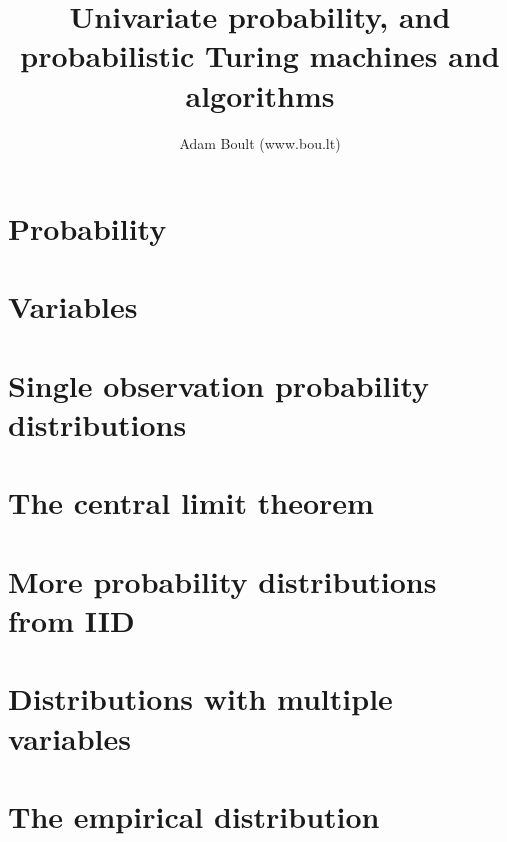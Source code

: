 \documentclass[oneside]{book}
\begin{document}
\author{Adam Boult (www.bou.lt)}
\title{Univariate probability, and probabilistic Turing machines and algorithms}
\maketitle

\setcounter{tocdepth}{0}
\tableofcontents



\part{Probability}




\part{Variables}







\part{Single observation probability distributions}



\part{The central limit theorem}





\part{More probability distributions from IID}







\part{Distributions with multiple variables}



\part{The empirical distribution}

\end{document}
